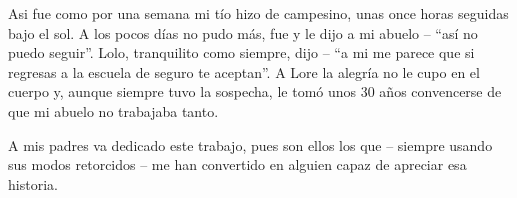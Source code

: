 \documentclass[11pt]{book}
\begin{document}
Asi fue como por una semana mi tío hizo de campesino, unas once horas seguidas bajo el sol.
A los pocos días no pudo más, fue y le dijo a mi abuelo -- ``así no puedo seguir''.
Lolo, tranquilito como siempre, dijo -- ``a mi me parece que si regresas a la escuela de seguro te aceptan''.
A Lore la alegr\'ia no le cupo en el cuerpo y, aunque siempre tuvo la sospecha, le tom\'o unos 30 años convencerse de que mi abuelo no trabajaba tanto.

A mis padres va dedicado este trabajo, pues son ellos los que -- siempre usando sus modos retorcidos -- me han convertido en alguien capaz de apreciar esa historia.
\vspace*{\fill}
\thispagestyle{empty}

%

\newpage\thispagestyle{empty}\addtocounter{page}{-1}
~\newpage\thispagestyle{empty}\addtocounter{page}{-1}




\setcounter{page}{1}


\markboth{}{}
\thispagestyle{empty}


\newpage\thispagestyle{empty}\addtocounter{page}{-1}
~\newpage\thispagestyle{empty}\addtocounter{page}{-1}

{}
\tableofcontents%

\printglossaries



\end{document}
